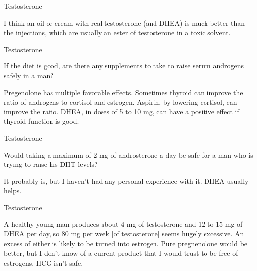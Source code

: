 \documentclass[11pt,oneside,openany,extrafontsizes]{memoir}
\begin{document}
\begin{standalonequote}{Testosterone}

    \begin{answer}
      I think an oil or cream with real testosterone (and DHEA) is much better than the injections, which are usually an ester of testosterone in a toxic solvent.
    \end{answer}
\end{standalonequote}

\begin{qaexchange}{Testosterone}

    \begin{question}
        If the diet is good, are there any supplements to take to raise serum androgens safely in a man?
    \end{question}

    \begin{answer}
      Pregenolone has multiple favorable effects. Sometimes thyroid can improve the ratio of androgens to cortisol and estrogen. Aspirin, by lowering cortisol, can improve the ratio. DHEA, in doses of 5 to 10 mg, can have a positive effect if thyroid function is good.
    \end{answer}
\end{qaexchange}

\begin{qaexchange}{Testosterone}

    \begin{question}
        Would taking a maximum of 2 mg of androsterone a day be safe for a man who is trying to raise his DHT levels?
    \end{question}

    \begin{answer}
       It probably is, but I haven't had any personal experience with it. DHEA usually helps. 
    \end{answer}
\end{qaexchange}

\begin{standalonequote}{Testosterone}

    \begin{answer}
      A healthy young man produces about 4 mg of testosterone and 12 to 15 mg of DHEA per day, so 80 mg per week [of testosterone] seems hugely excessive. An excess of either is likely to be turned into estrogen. Pure pregnenolone would be better, but I don't know of a current product that I would trust to be free of estrogens. HCG isn't safe.
    \end{answer}
\end{standalonequote}
\end{document}

